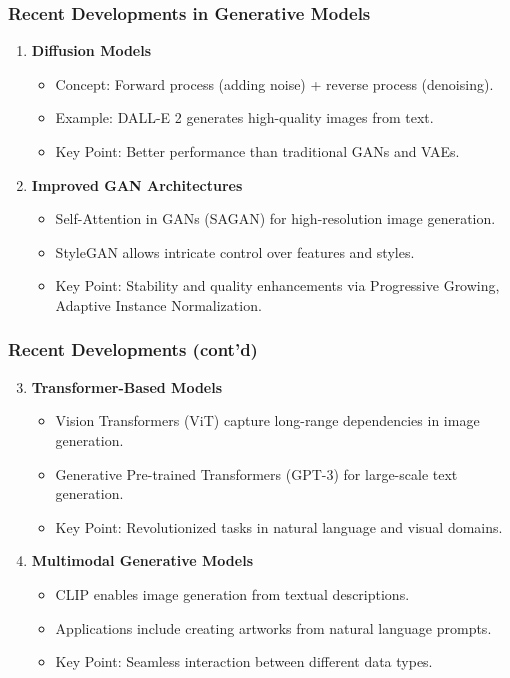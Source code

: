 \documentclass[aspectratio=169]{beamer}
\begin{document}
\begin{frame}[fragile]
    \frametitle{Recent Developments in Generative Models}
    \begin{enumerate}
        \item \textbf{Diffusion Models}
        \begin{itemize}
            \item Concept: Forward process (adding noise) + reverse process (denoising).
            \item Example: DALL-E 2 generates high-quality images from text.
            \item Key Point: Better performance than traditional GANs and VAEs.
        \end{itemize}
        
        \item \textbf{Improved GAN Architectures}
        \begin{itemize}
            \item Self-Attention in GANs (SAGAN) for high-resolution image generation.
            \item StyleGAN allows intricate control over features and styles.
            \item Key Point: Stability and quality enhancements via Progressive Growing, Adaptive Instance Normalization.
        \end{itemize}
    \end{enumerate}
\end{frame}

\begin{frame}[fragile]
    \frametitle{Recent Developments (cont'd)}
    \begin{enumerate}
        \setcounter{enumi}{2}
        \item \textbf{Transformer-Based Models}
        \begin{itemize}
            \item Vision Transformers (ViT) capture long-range dependencies in image generation.
            \item Generative Pre-trained Transformers (GPT-3) for large-scale text generation.
            \item Key Point: Revolutionized tasks in natural language and visual domains.
        \end{itemize}
        
        \item \textbf{Multimodal Generative Models}
        \begin{itemize}
            \item CLIP enables image generation from textual descriptions.
            \item Applications include creating artworks from natural language prompts.
            \item Key Point: Seamless interaction between different data types.
        \end{itemize}
    \end{enumerate}
\end{frame}
\end{document}

